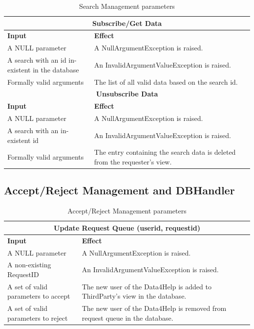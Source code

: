 \documentclass[a4paper, hidelinks, 12pt]{report}
\begin{document}
\begin{table}[h]
		\centering
		\begin{tabular}{|p{6cm}|p{9cm}|}
			\hline\hline
			\multicolumn{2}{c}{\textbf{Subscribe/Get Data}} \\
			\hline
			\textbf{Input} & \textbf{Effect} \\ [0.5ex]
			\hline
			A NULL parameter & A NullArgumentException is raised.  \\
			\hline
			A search with an id in-existent in the database & An InvalidArgumentValueException is raised.\\
			\hline
			Formally valid arguments & The list of all valid data based on the search id.\\
			\hline\hline
			\multicolumn{2}{c}{\textbf{Unsubscribe Data}} \\
			\hline
			\textbf{Input} & \textbf{Effect} \\ [0.5ex]
			\hline
			A NULL parameter & A NullArgumentException is raised.  \\
			\hline
			A search with an in-existent id & An InvalidArgumentValueException is raised.\\
			\hline
			Formally valid arguments & The entry containing the search data is deleted from the requester's view.\\
			\hline
			
		\end{tabular}
		\caption{Search Management parameters}
		\label{fig:Search Management parameters}
	\end{table}
	
	\subsection{Accept/Reject Management and DBHandler}

\begin{table}[H]
		\centering
		\begin{tabular}{|p{6cm}|p{9cm}|}
			\hline\hline
			\multicolumn{2}{c}{\textbf{Update Request Queue (userid, requestid)} }\\
			\hline
			\textbf{Input} & \textbf{Effect} \\ [0.5ex]
			\hline
			A NULL parameter & A NullArgumentException is raised.  \\
			\hline
			A non-existing RequestID & An InvalidArgumentValueException is raised.\\
			\hline
			A set of valid parameters to accept & The new user of the Data4Help is added to ThirdParty's view in the database.\\
			
			\hline
			A set of valid parameters to reject & The new user of the Data4Help is removed from request queue in the database.\\
			\hline
			
		\end{tabular}
		\caption{Accept/Reject Management parameters}
		\label{fig:Accept/Reject Management parameters}
	\end{table}
	
\end{document}
